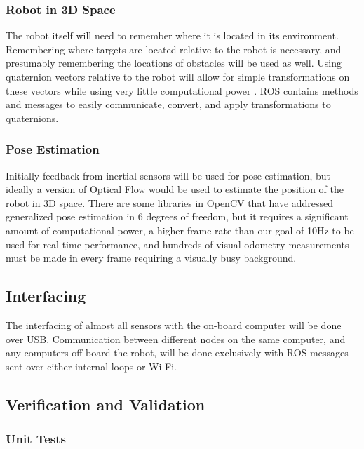 \documentclass{article}
\begin{document}
		\subsubsection{Robot in 3D Space}
		
		The robot itself will need to remember where it is located in its environment. Remembering where targets are located relative to the robot is necessary, and presumably remembering the locations of obstacles will be used as well. Using quaternion vectors relative to the robot will allow for simple transformations on these vectors while using very little computational power \cite{williams2010combining}. ROS contains methods and messages to easily communicate, convert, and apply transformations to quaternions.
	
		\subsubsection{Pose Estimation}
	
		Initially feedback from inertial sensors will be used for pose estimation, but ideally a version of Optical Flow would be used to estimate the position of the robot in 3D space. There are some libraries in OpenCV that have addressed generalized pose estimation in 6 degrees of freedom, but it requires a significant amount of computational power, a higher frame rate than our goal of 10Hz to be used for real time performance, and hundreds of visual odometry measurements must be made in every frame requiring a visually busy background.

	\subsection{Interfacing}
	
	The interfacing of almost all sensors with the on-board computer will be done over USB. Communication between different nodes on the same computer, and any computers off-board the robot, will be done exclusively with ROS messages sent over either internal loops or Wi-Fi.

	\subsection{Verification and Validation}
	
	\subsubsection{Unit Tests}
	
\end{document}
